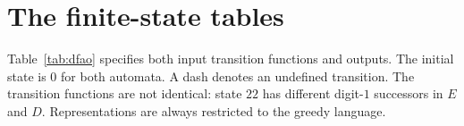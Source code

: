 \clearpage
\section{The finite-state tables}
Table~\ref{tab:dfao} specifies both input transition functions and outputs.
The initial state is $0$ for both automata. A dash denotes an undefined
transition. The transition functions are not identical: state $22$ has
different digit-$1$ successors in $E$ and $D$. Representations are always
restricted to the greedy language.
\begin{table}[htbp]
\centering\small

\caption{The $E$- and $D$-DFAOs used in the main text. Columns $0$ and $1$
give successor states; ``out'' gives the output.}
\label{tab:dfao}
\end{table}
